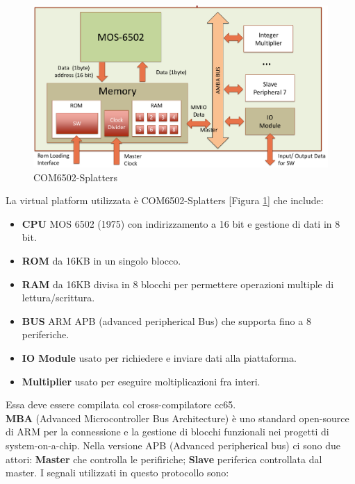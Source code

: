 \documentclass[]{IEEEtran}
\begin{document}
\begin{figure}[!htb]
    \centering
    \includegraphics[width=0.9\linewidth]{figures/splatters}
    \caption{COM6502-Splatters}
    \label{fig:splatters}
\end{figure}
La virtual platform utilizzata è COM6502-Splatters [Figura \ref{fig:splatters}] che include:
\begin{itemize}
    \item \textbf{CPU} MOS 6502 (1975) con indirizzamento a 16 bit e gestione di dati in 8 bit.
    \item \textbf{ROM} da 16KB in un singolo blocco.
    \item \textbf{RAM} da 16KB divisa in 8 blocchi per permettere operazioni multiple di lettura/scrittura.
    \item \textbf{BUS} ARM APB (advanced peripherical Bus) che supporta fino a 8 periferiche.
    \item \textbf{IO Module} usato per richiedere e inviare dati alla piattaforma.
    \item \textbf{Multiplier} usato per eseguire moltiplicazioni fra interi.
\end{itemize}
Essa deve essere compilata col cross-compilatore cc65\cite{CC65}.
\\\textbf{MBA} (Advanced Microcontroller Bus Architecture) è uno standard open-source di ARM per la connessione e la gestione di blocchi funzionali nei progetti di system-on-a-chip. Nella versione APB (Advanced peripherical bus) ci sono due attori: \textbf{Master} che controlla le perifiriche; \textbf{Slave} periferica controllata dal master. I segnali utilizzati in questo protocollo sono:
\end{document}

